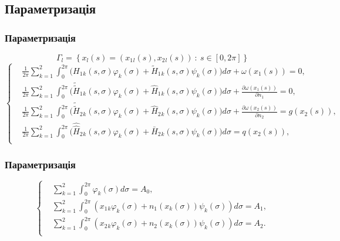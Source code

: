 \documentclass[10pt]{beamer}
\begin{document}
\subsection{Параметризація}
\begin{frame}
\frametitle{Параметризація}

$$\Gamma_l=\left\{x_l(s)=(x_1{_l}(s),x_2{_l}(s)) \ : \ s\in [0,2\pi]\right\}$$
\small
 \begin{equation}
 		\left\{
	 	\begin{split}
		\label{paramSystem1}
	 		&\frac{1}{2\pi}\sum_{k=1}^{2}\int_{0}^{2\pi}\big(H_1{_k}(s, \sigma)\varphi_k(\sigma)+\tilde{H}_1{_k}(s, \sigma)\psi_k(\sigma)\big)d\sigma+\omega(x_1(s))=0, \\
			&\frac{1}{2\pi}\sum_{k=1}^{2}\int_{0}^{2\pi}\big(\tilde{\tilde{H}}_1{_k}(s, \sigma)\varphi_k(\sigma)+\hat{H}_1{_k}(s, \sigma)\psi_k(\sigma)\big)d\sigma+\frac{\partial\omega(x_1(s))}{\partial n_1}=0, \\
			&\frac{1}{2\pi}\sum_{k=1}^{2}\int_{0}^{2\pi}\big(\tilde{\tilde{H}}_2{_k}(s, \sigma)\varphi_k(\sigma)+\hat{H}_2{_k}(s, \sigma)\psi_k(\sigma)\big)d\sigma+\frac{\partial\omega(x_2(s))}{\partial n_2}=g(x_2(s)), \\
			&\frac{1}{2\pi}\sum_{k=1}^{2}\int_{0}^{2\pi}\big(\hat{\hat{H}}_2{_k}(s, \sigma)\varphi_k(\sigma)+\bar{H}_2{_k}(s, \sigma)\psi_k(\sigma)\big)d\sigma=q(x_2(s)), \\
		\end{split}
		\right.
\end{equation}

\end{frame}

\begin{frame}
\frametitle{Параметризація}

 \begin{equation}
 		\left\{
	 	\begin{split}
		\label{paramSystem2}
			&\sum_{k=1}^{2}\int_{0}^{2\pi}\varphi_k(\sigma)d\sigma=A_0, \\
			&\sum_{k=1}^{2}\int_{0}^{2\pi}(x_1{_k}\varphi_k(\sigma)+n_1(x_k(\sigma))\psi_k(\sigma))d\sigma=A_1, \\
			&\sum_{k=1}^{2}\int_{0}^{2\pi}(x_2{_k}\varphi_k(\sigma)+n_2(x_k(\sigma))\psi_k(\sigma))d\sigma=A_2. \\
		\end{split}
		\right.
\end{equation}

\end{frame}
\end{document}
